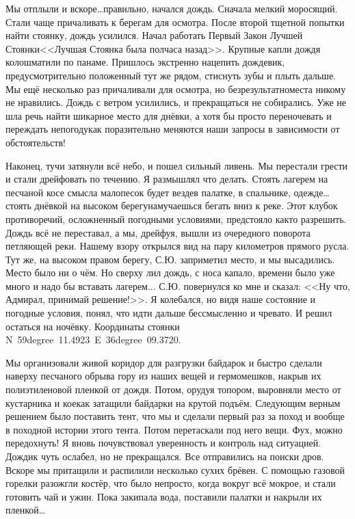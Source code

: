 Мы отплыли и вскоре\ldots  правильно, начался дождь. Сначала мелкий моросящий. Стали чаще причаливать к берегам для осмотра. После второй тщетной попытки найти стоянку, дождь усилился. Начал работать Первый Закон Лучшей Стоянки\mdash <<Лучшая Стоянка была полчаса назад>>. Крупные капли дождя колошматили по панаме. Пришлось экстренно нацепить дождевик, предусмотрительно положенный тут же рядом, стиснуть зубы и плыть дальше. Мы ещё несколько раз причаливали для осмотра, но безрезультатно\mdash места никому не нравились. Дождь с ветром усилились, и прекращаться не собирались. Уже не шла речь найти шикарное место для днёвки, а хотя бы просто переночевать и переждать непогоду\mdash как поразительно меняются наши запросы в зависимости от обстоятельств!

Наконец, тучи затянули всё небо, и пошел сильный ливень. Мы перестали грести и стали дрейфовать по течению. Я размышлял что делать. Стоять лагерем на песчаной косе смысла мало\mdash песок будет везде\mdash в палатке, в спальнике, одежде\ldots  стоять днёвкой на высоком берегу\mdash намучаешься бегать вниз к реке. Этот клубок противоречий, осложненный погодными условиями, предстояло как\sdash то разрешить. Дождь всё не переставал, а мы, дрейфуя, вышли из очередного поворота петляющей реки. Нашему взору открылся вид на пару километров прямого русла. Тут же, на высоком правом берегу, С.Ю. заприметил место, и мы высадились. Место было ни о чём. Но сверху лил дождь, с носа капало, времени было уже много и надо бы вставать лагерем... С.Ю. повернулся ко мне и сказал: <<Ну что, Адмирал, принимай решение!>>. Я колебался, но видя наше состояние и погодные условия, понял, что идти дальше бессмысленно и чревато. И решил остаться на ночёвку. Координаты стоянки N~59degree~11.4923\textprime~E~36degree~09.3720\textprime.

Мы организовали живой коридор для разгрузки байдарок и быстро сделали наверху песчаного обрыва гору из наших вещей и гермомешков, накрыв их полиэтиленовой пленкой от дождя. Потом, орудуя топором, выровняли место от кустарника и кое\sdash как затащили байдарки на крутой подъём. Следующим верным решением было поставить тент, что мы и сделали первый раз за поход и вообще в походной истории этого тента. Потом перетаскали под него вещи. Фух, можно передохнуть! Я вновь почувствовал уверенность и контроль над ситуацией. Дождик чуть ослабел, но не прекращался. Все отправились на поиски дров. Вскоре мы притащили и распилили несколько сухих брёвен. С помощью газовой горелки разожгли костёр, что было непросто, когда вокруг всё мокрое, и стали готовить чай и ужин. Пока закипала вода, поставили палатки и накрыли их пленкой\ldots  

